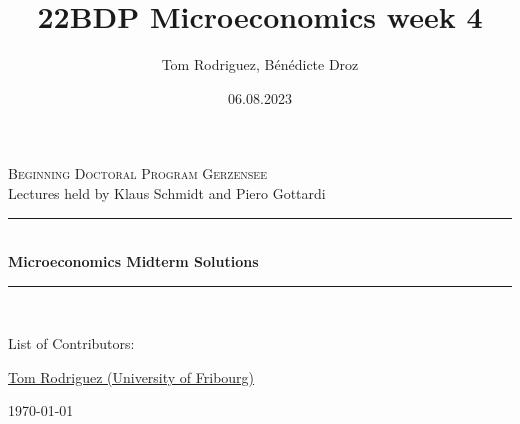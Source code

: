 \documentclass[12pt]{article}
\title{22BDP Microeconomics week 4}
\author{Tom Rodriguez, Bénédicte Droz}
\date{06.08.2023}
\begin{document}
\begin{titlepage}
	
	\newcommand{\HRule}{\rule{\linewidth}{0.5mm}} %
	
	\center %
	
	
	\textsc{\large Beginning Doctoral Program Gerzensee}\\[0.5cm] %
	{\large Lectures held by Klaus Schmidt and Piero Gottardi}\\[1cm] %
	
	
	
	\HRule \\[1.0cm]
	{ \LARGE \bfseries Microeconomics Midterm Solutions}\\[0.4cm] %
	\HRule \\[2cm]
	
	

	
	\begin{flushleft}
        \Large List of Contributors:
        
        \color{blue}
		{\large 
            \href{https://rodrigueztom.github.io}{Tom Rodriguez (University of Fribourg)}
        }\color{black}
	\end{flushleft}
	
	
	
	{\large \today} %
	
	\vfill 
	
\end{titlepage}
\end{document}
